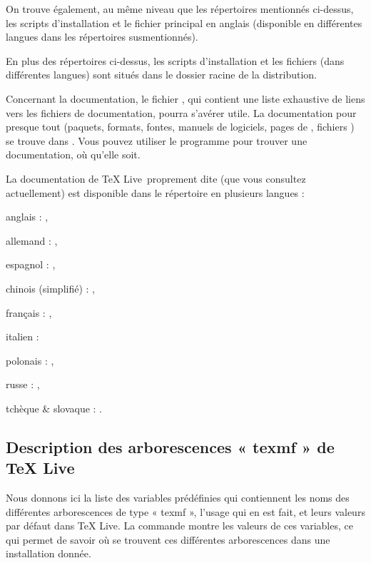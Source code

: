 \documentclass[german, english, french, 12pt]{article}
\renewcommand{\TL}{\TeX{} Live\xspace}%
\begin{document}
On trouve également, au même niveau que les répertoires mentionnés ci-dessus,
les scripts d'installation et le fichier  principal en anglais
(disponible en différentes langues dans les répertoires 
susmentionnés).

En plus des répertoires ci-dessus, les scripts d'installation et les fichiers
 (dans différentes langues) sont situés dans le dossier racine
de la distribution.

Concernant la documentation, le fichier , qui contient une liste
exhaustive de liens vers les fichiers de documentation, pourra s'avérer utile.
La documentation pour presque tout (paquets, formats, fontes, manuels de
logiciels, pages de , fichiers ) se trouve dans
.  Vous pouvez utiliser le programme 
pour trouver une documentation, où qu'elle soit.

La documentation de \TL\ proprement dite (que vous consultez actuellement) est
disponible dans le répertoire  en plusieurs
langues :

\begin{itemize*}
\item{anglais :} ,
\item{allemand :} ,
\item{espagnol :} ,
\item{chinois (simplifié) :} ,
\item{français :} ,
\item{italien :} 
\item{polonais :} ,
\item{russe :} ,
\item{tchèque \& slovaque :} .
\end{itemize*}

\subsection{Description des arborescences « texmf » de \protect\TL}
\label{sec:texmftrees}

Nous donnons ici la liste des variables prédéfinies qui contiennent les noms des
différentes arborescences de type « texmf », l'usage qui en est fait, et leurs
valeurs par défaut dans \TL. La commande  montre les valeurs
de ces variables, ce qui permet de savoir où se trouvent ces différentes
arborescences dans une installation donnée.
\end{document}
